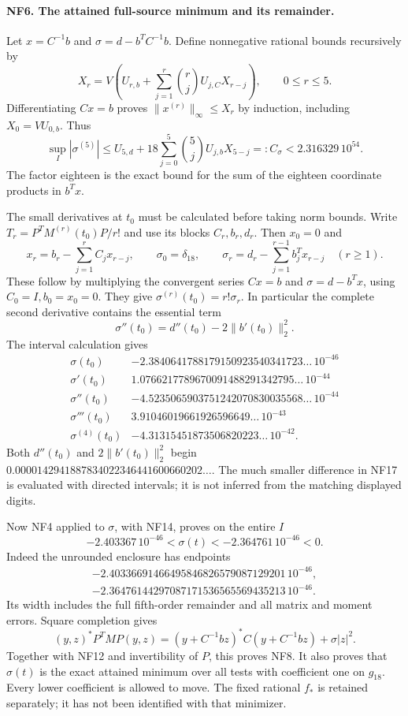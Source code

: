 \documentclass[11pt,a4paper]{article}
\theoremstyle{definition}\newtheorem{definition}[theorem]{Definition}
\begin{document}
\paragraph{NF6. The attained full-source minimum and its remainder.}
Let $x=C^{-1}b$ and $\sigma=d-b^TC^{-1}b$. Define nonnegative
rational bounds recursively by
\[
 X_r=V\left(U_{r,b}+\sum_{j=1}^r\binom rj U_{j,C}X_{r-j}\right),
 \qquad0\le r\le5.
 \tag{NF13}
\]
Differentiating $Cx=b$ proves $\|x^{(r)}\|_\infty\le X_r$ by
induction, including $X_0=VU_{0,b}$. Thus
\[
 \sup_I|\sigma^{(5)}|
 \le U_{5,d}+18\sum_{j=0}^5\binom5j U_{j,b}X_{5-j}
 =:C_\sigma<2.316329\,10^{54}.
 \tag{NF14}
\]
The factor eighteen is the exact bound for the sum of the
eighteen coordinate products in $b^Tx$.

The small derivatives at $t_0$ must be calculated before taking
norm bounds. Write $T_r=P^TM^{(r)}(t_0)P/r!$ and use its blocks
$C_r,b_r,d_r$. Then $x_0=0$ and
\[
 x_r=b_r-\sum_{j=1}^r C_jx_{r-j},\qquad
 \sigma_0=\delta_{18},\qquad
 \sigma_r=d_r-\sum_{j=1}^{r-1}b_j^Tx_{r-j}\quad(r\ge1).
 \tag{NF15}
\]
These follow by multiplying the convergent series $Cx=b$ and
$\sigma=d-b^Tx$, using $C_0=I,b_0=x_0=0$.
They give $\sigma^{(r)}(t_0)=r!\sigma_r$. In particular the
complete second derivative contains the essential term
\[
 \sigma''(t_0)=d''(t_0)-2\|b'(t_0)\|_2^2.
 \tag{NF16}
\]
The interval calculation gives
\[
\begin{array}{c|l}
\sigma(t_0)&-2.3840641788179150923540341723\ldots\,10^{-46}\\
\sigma'(t_0)&1.0766217789670091488291342795\ldots\,10^{-44}\\
\sigma''(t_0)&-4.5235065903751242070830035568\ldots\,10^{-44}\\
\sigma'''(t_0)&3.91046019661926596649\ldots\,10^{-43}\\
\sigma^{(4)}(t_0)&-4.31315451873506820223\ldots\,10^{-42}.
\end{array}\tag{NF17}
\]
Both $d''(t_0)$ and $2\|b'(t_0)\|_2^2$ begin
$0.0000142941887834022346441600660202\ldots$.
The much smaller difference in NF17 is evaluated with directed
intervals; it is not inferred from the matching displayed digits.

Now NF4 applied to $\sigma$, with NF14, proves on the entire $I$
\[
 -2.403367\,10^{-46}<\sigma(t)<-2.364761\,10^{-46}<0.
 \tag{NF18}
\]
Indeed the unrounded enclosure has endpoints
\[
\begin{aligned}
-2.40336691466495846826579087129201\,10^{-46},\\
-2.36476144297087171536565569435213\,10^{-46}.
\end{aligned}
\]
Its width includes the full fifth-order remainder and all matrix
and moment errors. Square completion gives
\[
 (y,z)^*P^TMP(y,z)
 =(y+C^{-1}bz)^*C(y+C^{-1}bz)+\sigma|z|^2.
 \tag{NF19}
\]
Together with NF12 and invertibility of $P$, this proves NF8.
It also proves that $\sigma(t)$ is the exact attained minimum
over all tests with coefficient one on $g_{18}$. Every lower
coefficient is allowed to move. The fixed rational $f_*$ is
retained separately; it has not been identified with that
minimizer.
\end{document}
